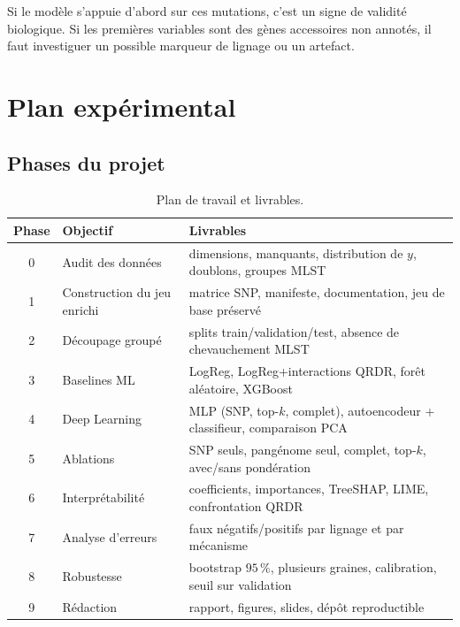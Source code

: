 \documentclass[11pt,a4paper]{article}
\begin{document}
Si le modèle s'appuie d'abord sur ces mutations, c'est un signe de validité biologique. Si les premières variables sont des gènes accessoires non annotés, il faut investiguer un possible marqueur de lignage ou un artefact.

\section{Plan expérimental}

\subsection{Phases du projet}

\begin{table}[H]
\centering
\caption{Plan de travail et livrables.}
\label{tab:plan}
\begin{tabularx}{\textwidth}{clX}
\toprule
\textbf{Phase} & \textbf{Objectif} & \textbf{Livrables} \\
\midrule
0 & Audit des données & dimensions, manquants, distribution de $y$, doublons, groupes MLST \\
1 & Construction du jeu enrichi & matrice SNP, manifeste, documentation, jeu de base préservé \\
2 & Découpage groupé & splits train/validation/test, absence de chevauchement MLST \\
3 & Baselines ML & LogReg, LogReg+interactions QRDR, forêt aléatoire, XGBoost \\
4 & Deep Learning & MLP (SNP, top-$k$, complet), autoencodeur + classifieur, comparaison PCA \\
5 & Ablations & SNP seuls, pangénome seul, complet, top-$k$, avec/sans pondération \\
6 & Interprétabilité & coefficients, importances, TreeSHAP, LIME, confrontation QRDR \\
7 & Analyse d'erreurs & faux négatifs/positifs par lignage et par mécanisme \\
8 & Robustesse & bootstrap $95\,\%$, plusieurs graines, calibration, seuil sur validation \\
9 & Rédaction & rapport, figures, slides, dépôt reproductible \\
\bottomrule
\end{tabularx}
\end{table}
\end{document}
